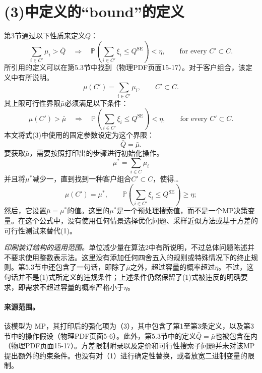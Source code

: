\documentclass{article}
\begin{document}
\section*{(3)中定义的“bound”的定义}
第3节通过以下性质来定义$\bar Q$：
\[
\sum_{i\in C'}\mu_i>\bar Q
\quad\Longrightarrow\quad
\mathbb P\left(\sum_{i\in C'}\xi_i\leq Q^{\mathrm{SE}}\right)<\eta,
\qquad\text{for every }C'\subset C.
\]
所引用的定义可以在第5.3节中找到（物理PDF页面15-17）。对于客户组合，该定义中有所说明。
\[
\mu(C')=\sum_{i\in C'}\mu_i,\qquad C'\subset C.
\]
其上限可行性界限$\bar\mu$必须满足以下条件：
\[
\mu(C')>\bar\mu
\quad\Longrightarrow\quad
\mathbb P\left(\sum_{i\in C'}\xi_i\leq Q^{\mathrm{SE}}\right)<\eta,
\qquad\text{for every }C'\subset C.
\]
本文将式(3)中使用的固定参数设定为这个界限：
\[
\boxed{\bar Q=\bar\mu.}
\]
要获取$\bar\mu$，需要按照打印出的步骤进行初始化操作。
\[
\mu^*=\sum_{i\in C}\mu_i
\]
并且将$\mu^*$减少一，直到找到一种客户组合$C'\subset C$，使得…
\[
\mu(C')=\mu^*,\qquad
\mathbb P\left(\sum_{i\in C'}\xi_i\leq Q^{\mathrm{SE}}\right)\geq\eta;
\]
然后，它设置$\bar\mu=\mu^*$的值。这里的$\mu^*$是一个预处理搜索值，而不是一个MP决策变量。在这个公式中，没有使用任何情景选择优化问题、采样近似方法或基于方差的可行性测试来替代(1)。

\noindent\textit{印刷装订结构的适用范围。}单位减少量在算法2中有所说明，不过总体问题陈述并不要求使用整数表示法。这里没有添加任何四舍五入的规则或特殊情况下的终止规则。第5.3节中还包含了一句话，即除了$\bar\mu$之外，超过容量的概率超过$\eta$。不过，这句话并不是(1)式所定义的违规条件；上述条件仍然保留了(1)式被违反的明确要求，即需求不超过容量的概率严格小于$\eta$。

\paragraph{来源范围。}
该模型为 MP，其打印后的强化项为（3），其中包含了第1至第3条定义，以及第3节中的操作假设（物理PDF页面5-6）。此外，第5.3节中的定义$\bar Q=\bar\mu$也被包含在内（物理PDF页面15-17）。方差限制附录以及定价和可行性搜索子问题并未对该MP提出额外的约束条件。也没有对（1）进行确定性替换，或者放宽二进制变量的限制。
\end{document}
